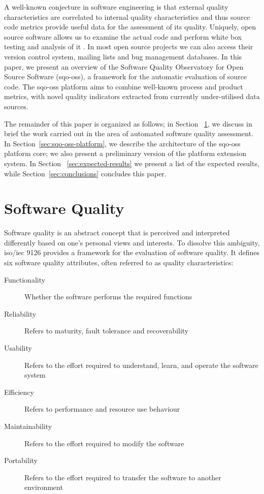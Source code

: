\documentclass{llncs}
\begin{document}
A well-known conjecture in software engineering is that external quality 
characteristics are correlated to internal quality characteristics and thus 
source code metrics provide useful data for the assessment of its 
quality. Uniquely, open source software allows us to examine the actual code
and perform white box testing and analysis of it \cite{Spi06}.
In most open source 
projects we can also access their version control system, mailing lists and 
bug management databases. In this paper, we present an overview of
the Software Quality 
Observatory for Open Source Software ({\sc sqo-oss}), a framework for the
automatic
evaluation of source code. The {\sc sqo-oss} platform aims to combine well-known 
process and product metrics, with novel quality indicators extracted from 
currently under-utilised data sources. 

The remainder of this paper is organized as follows; in Section
~\ref{sec:soft-quality}, we discuss in brief the work carried out in the area of
automated software quality assessment. In Section~\ref{sec:sqo-oss-platform},
we describe the architecture of the {\sc sqo-oss} platform core; we also present
a preliminary version of the platform extension system. In Section
~\ref{sec:expected-results} we present a list of the expected results, while 
Section~\ref{sec:conclusions} concludes this paper.

\section{Software Quality} %
\label{sec:soft-quality}
\label{sec:quality-attributes}

Software quality is an abstract concept that is perceived and interpreted differently
based on one's personal views and interests. To dissolve this ambiguity, {\sc iso/iec}
9126 \cite{ISO9126} provides a framework for the evaluation of software quality.
It defines six software quality attributes, often referred to as quality
characteristics:
\begin{description}
  \item[Functionality] Whether the software performs the required functions
  \item[Reliability] Refers to maturity, fault tolerance and recoverability
  \item[Usability] Refers to the effort required to understand, learn, and 
  operate the software system
  \item[Efficiency] Refers to performance and resource use behaviour
  \item[Maintainability] Refers to the effort required to modify the software
  \item[Portability] Refers to the effort required to transfer the software to 
  another environment
\end{description}
\end{document}
